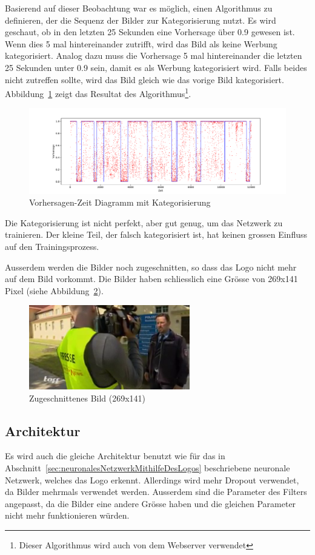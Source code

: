 \documentclass[12pt,a4paper]{report}
\begin{document}
Basierend auf dieser Beobachtung war es möglich, einen Algorithmus zu definieren, der die Sequenz der Bilder zur Kategorisierung nutzt.
Es wird geschaut, ob in den letzten 25 Sekunden eine Vorhersage über 0.9 gewesen ist.
Wenn dies 5 mal hintereinander zutrifft, wird das Bild als keine Werbung kategorisiert.
Analog dazu muss die Vorhersage 5 mal hintereinander die letzten 25 Sekunden unter 0.9 sein,
damit es als Werbung kategorisiert wird.
Falls beides nicht zutreffen sollte, wird das Bild gleich wie das vorige Bild kategorisiert.
Abbildung~\ref{fig:points_line} zeigt das Resultat des Algorithmus\footnote{Dieser Algorithmus wird auch von dem Webserver verwendet}.
\begin{figure}[h]%
    \centering
    \includegraphics[width=1.0\textwidth]{assets/python/points_blue_line.pdf}%
    \caption{Vorhersagen-Zeit Diagramm mit Kategorisierung}%
    \label{fig:points_line}%
\end{figure}
Die Kategorisierung ist nicht perfekt, aber gut genug, um das Netzwerk zu trainieren.
Der kleine Teil, der falsch kategorisiert ist, hat keinen grossen Einfluss auf den Trainingsprozess.

Ausserdem werden die Bilder noch zugeschnitten, so dass das Logo nicht mehr auf dem Bild vorkommt.
Die Bilder haben schliesslich eine Grösse von 269x141 Pixel (siehe Abbildung~\ref{fig:cropped_img}).
\begin{figure}[!h]%
    \centering
    \includegraphics[width=7cm]{assets/images/cropped.png}%
    \caption{Zugeschnittenes Bild (269x141)}%
    \label{fig:cropped_img}%
\end{figure}
\subsection{Architektur}
Es wird auch die gleiche Architektur benutzt wie für das in Abschnitt~\ref{sec:neuronalesNetzwerkMithilfeDesLogos} beschriebene neuronale Netzwerk,
welches das Logo erkennt.
Allerdings wird mehr Dropout verwendet, da Bilder mehrmals verwendet werden.
Ausserdem sind die Parameter des Filters angepasst, da die Bilder eine andere Grösse haben und die gleichen Parameter nicht mehr funktionieren würden.
\end{document}
